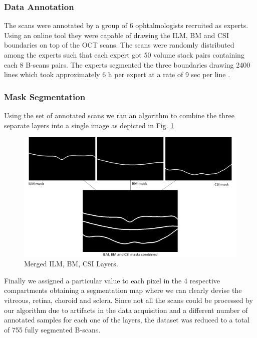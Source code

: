 \documentclass[12pt,a4paper]{scrartcl}
\begin{document}
\subsubsection{Data Annotation}

The scans were annotated by a group of 6 ophtalmologists recruited as experts. Using an online tool they were capable of drawing the ILM, BM and CSI boundaries on top of the OCT scans. The scans were randomly distributed among the experts such that each expert got 50 volume stack pairs containing each 8 B-scans pairs. The experts segmented the three boundaries drawing 2400 lines which took approximately 6 h per expert at a rate of 9 sec per line \cite{Ronchetti2019}.

\subsubsection{Mask Segmentation}
Using the set of annotated scans we ran an algorithm to combine the three separate layers into a single image as depicted in Fig. \ref{fig:merged}

\begin{figure}[H]
    \centering
    \includegraphics[width=1\textwidth]{./images/ILM_BM_CSI_merged.png}
    \caption{Merged ILM, BM, CSI Layers.}
    \label{fig:merged}
\end{figure}

Finally we assigned a particular value to each pixel in the 4 respective compartments obtaining a segmentation map where we can clearly devise the vitreous, retina, choroid and sclera. Since not all the scans could be processed by our algorithm due to artifacts in the data acquisition and a different number of annotated samples for each one of the layers, the dataset was reduced to a total of 755 fully segmented B-scans.
\end{document}

